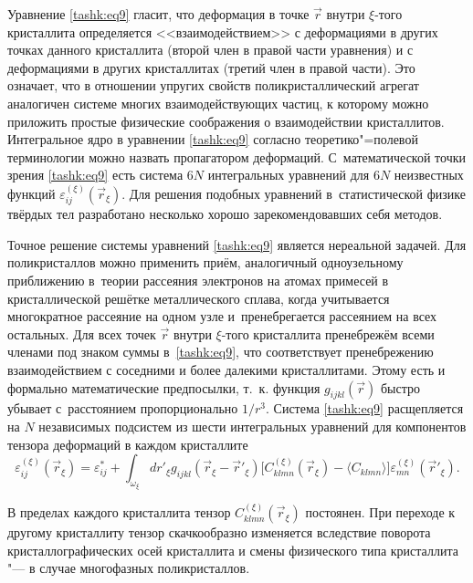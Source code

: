 Уравнение \eqref{tashk:eq9} гласит, что деформация в точке $\vec {r}$ внутри $\xi$-того кристаллита определяется <<взаимодействием>> с деформациями в других точках данного кристаллита (второй член в правой части уравнения) и с деформациями в других кристаллитах (третий член в правой части). 
Это означает, что в отношении упругих свойств поликристаллический агрегат аналогичен системе многих взаимодействующих частиц, к которому можно приложить простые физические соображения о взаимодействии кристаллитов. 
Интегральное ядро в уравнении \eqref{tashk:eq9} согласно теоретико"=полевой терминологии можно назвать
пропагатором деформаций. 
С~математической точки зрения \eqref{tashk:eq9} есть система $6N$ интегральных уравнений для $6N$ неизвестных функций $\varepsilon _{ij}^{(\xi )} (\vec {r}_\xi)$. 
Для решения подобных уравнений в~статистической физике твёрдых тел разработано несколько хорошо зарекомендовавших себя методов.

\smallskip

Точное решение системы уравнений \eqref{tashk:eq9} является нереальной задачей. 
Для поликристаллов можно применить приём, аналогичный одноузельному приближению в~теории рассеяния электронов на атомах примесей в кристаллической решётке металлического сплава, когда учитывается многократное рассеяние на одном узле и~пренебрегается рассеянием на всех остальных. 
Для всех точек $\vec {r}$ внутри $\xi$-того кристаллита пренебрежём всеми членами под знаком суммы в~\eqref{tashk:eq9}, что соответствует пренебрежению взаимодействием с соседними и более далекими кристаллитами. 
Этому есть и формально математические предпосылки, т.~к. функция $g_{ijkl}(\vec{r})$ быстро убывает с~расстоянием пропорционально $1 /r^3$. 
Система \eqref{tashk:eq9} расщепляется на $N$ независимых подсистем из шести интегральных уравнений для компонентов тензора деформаций в каждом кристаллите
\begin{equation}
\label{tashk:eq10}
\varepsilon _{ij}^{(\xi )} (\vec {r}_\xi)=\varepsilon_{ij}^\ast
+ \int _{\omega_\xi} d r'_\xi g_{ijkl} (\vec {r}_\xi -\vec
{r}'_\xi )
\bigl[ C_{klmn}^{(\xi )} (\vec {r}_\xi)-\langle C_{klmn}
\rangle \bigr]\varepsilon _{mn}^{(\xi )} (\vec {r}'_\xi).
\end{equation}

В пределах каждого кристаллита тензор $C_{klmn}^{(\xi)} (\vec {r}_\xi)$ постоянен. 
При переходе к другому кристаллиту тензор скачкообразно
изменяется вследствие поворота кристаллографических осей кристаллита и смены
физического типа кристаллита "--- в случае многофазных поликристаллов.

